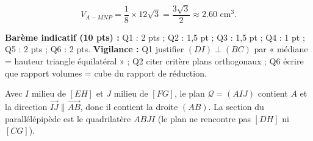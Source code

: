 \documentclass[11pt]{article}
\begin{document}
\begin{corrige}
\begin{enumerate}
\[ V_{A-MNP} = \frac{1}{8}\times 12\sqrt{3} = \frac{3\sqrt{3}}{2} \approx \num{2,60} \text{ cm}^3. \]
\end{enumerate}
\textbf{Barème indicatif (10 pts) :} Q1 : 2 pts ; Q2 : 1,5 pt ; Q3 : 1,5 pt ; Q4 : 1 pt ; Q5 : 2 pts ; Q6 : 2 pts.
\textbf{Vigilance :} Q1 justifier $(DI)\perp(BC)$ par « médiane = hauteur triangle équilatéral » ; Q2 citer critère plans orthogonaux ; Q6 écrire que rapport volumes = cube du rapport de réduction.
\end{corrige}

\begin{attention}
Avec $I$ milieu de $[EH]$ et $J$ milieu de $[FG]$, le plan $\mathcal{Q}=(AIJ)$ contient $A$ et la direction $\overrightarrow{IJ}\parallel\overrightarrow{AB}$, donc il contient la droite $(AB)$. La section du parallélépipède est le quadrilatère $ABJI$ (le plan ne rencontre pas $[DH]$ ni $[CG]$).
\end{attention}
\end{document}

